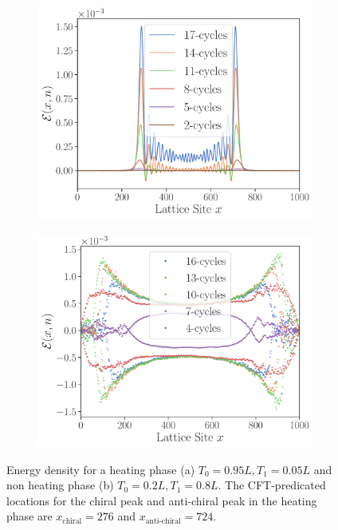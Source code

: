 \documentclass[11pt, a4paper, oneside]{book}
\theoremstyle{definition} %
\begin{document}
\begin{figure}[h]
\centering
\begin{subfigure}[t]{0.49\textwidth}
	\centering
	\includegraphics[width =\textwidth]{Energy_Density1}
	\caption{}
	\label{Energy_density_heating}
\end{subfigure}
\begin{subfigure}[t]{0.49\textwidth}
	\centering
	\includegraphics[width =\textwidth]{Energy_Density2}
	\caption{}
	\label{Energy_density_non-heating}
\end{subfigure}
\caption{Energy density for a heating phase (a) $T_0 = 0.95L, T_1 = 0.05L$ and non heating phase (b) $T_0 = 0.2L, T_1 = 0.8L$. The CFT-predicated locations for the chiral peak and anti-chiral peak in the heating phase are $x_{\text{chiral}} = 276$ and $x_{\text{anti-chiral}} = 724$.}
\end{figure}
\end{document}
